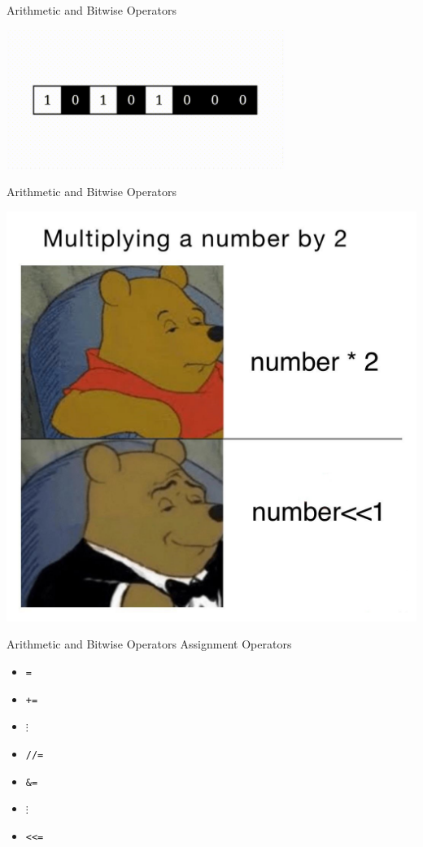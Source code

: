 \documentclass{beamer}
\begin{document}
    \begin{frame}{Arithmetic and Bitwise Operators}
        \begin{center}
            \includegraphics[scale = 0.8]{XOR After.png}
        \end{center}
    \end{frame}

    \begin{frame}{Arithmetic and Bitwise Operators}
        \begin{center}
            \includegraphics[scale = 0.25]{Bitwise_meme.jpg}
        \end{center}
    \end{frame}

    \begin{frame}{Arithmetic and Bitwise Operators}
        \color{blue} \Large Assignment Operators \\
        \color{black} \normalsize \vskip 10pt
        \begin{itemize}
            \item \texttt{=}
            \item \texttt{+=}
            \item $\vdots$
            \item \texttt{//=}
            \item \texttt{\&=}
            \item $\vdots$
            \item \texttt{<<=}
        \end{itemize}
    \end{frame}
\end{document}
